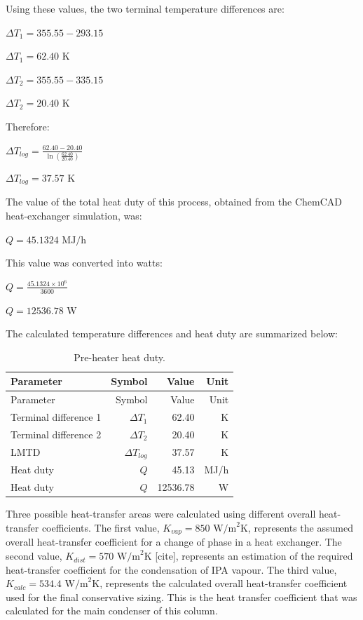 Using these values, the two terminal temperature differences are:

\(\Delta T_1 = 355.55 - 293.15\)

\(\Delta T_1 = 62.40 \text{ K}\)

\(\Delta T_2 = 355.55 - 335.15\)

\(\Delta T_2 = 20.40 \text{ K}\)

Therefore:

\(\Delta T_{log} = \frac{62.40 - 20.40}{\ln \left(\frac{62.40}{20.40}\right)}\)

\(\Delta T_{log} = 37.57 \text{ K}\)

The value of the total heat duty of this process, obtained from the
ChemCAD heat-exchanger simulation, was:

\(Q = 45.1324 \text{ MJ/h}\)

This value was converted into watts:

\(Q = \frac{45.1324 \times 10^6}{3600}\)

\(Q = 12536.78 \text{ W}\)

The calculated temperature differences and heat duty are summarized
below:

\begin{longtable}[]{@{}lrrr@{}}
\caption{Pre-heater heat duty.
\label{tab:Pre-heater heat duty}}\tabularnewline
\toprule\noalign{}
Parameter & Symbol & Value & Unit \\
\midrule\noalign{}
\endfirsthead
\toprule\noalign{}
Parameter & Symbol & Value & Unit \\
\midrule\noalign{}
\endhead
\bottomrule\noalign{}
\endlastfoot
Terminal difference 1 & \(\Delta T_1\) & 62.40 & K \\
Terminal difference 2 & \(\Delta T_2\) & 20.40 & K \\
LMTD & \(\Delta T_{log}\) & 37.57 & K \\
Heat duty & \(Q\) & 45.13 & MJ/h \\
Heat duty & \(Q\) & 12536.78 & W \\
\end{longtable}

Three possible heat-transfer areas were calculated using different
overall heat-transfer coefficients. The first value,
\(K_{vap} = 850 \text{ W/m}^2\text{K}\), represents the assumed overall
heat-transfer coefficient for a change of phase in a heat exchanger. The
second value, \(K_{dist} = 570 \text{ W/m}^2\text{K}\) {[}cite{]},
represents an estimation of the required heat-transfer coefficient for
the condensation of IPA vapour. The third value,
\(K_{calc} = 534.4 \text{ W/m}^2\text{K}\), represents the calculated
overall heat-transfer coefficient used for the final conservative
sizing. This is the heat transfer coefficient that was calculated for
the main condenser of this column.

